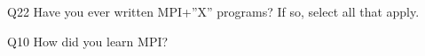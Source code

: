\begin{description}%
\item{Q22} Have you ever written MPI+”X” programs? If so, select all that apply.%
\item{Q10} How did you learn MPI?%
\end{description}%

